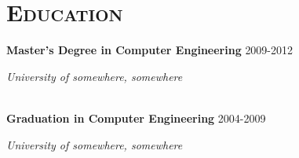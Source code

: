 \section*{\textsc{Education}}

\textbf{Master's Degree in Computer Engineering}    \hfill      {2009-2012}

\emph{University of somewhere, somewhere}

\lipsumsentence[2-4]
\\

\textbf{Graduation in Computer Engineering}    \hfill      {2004-2009}

\emph{University of somewhere, somewhere}

\lipsumsentence[2-4]
\\